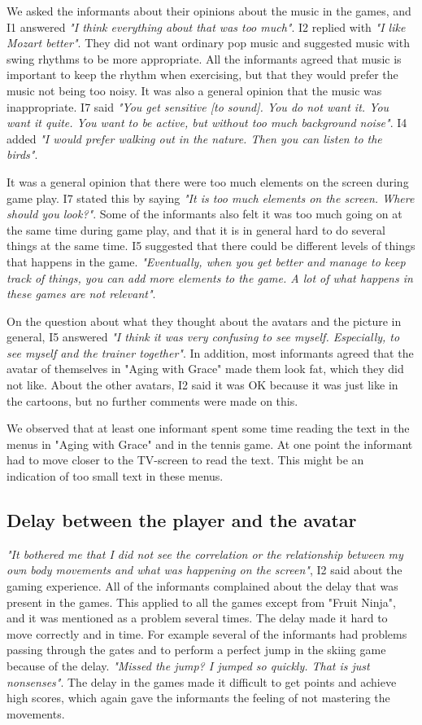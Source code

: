 We asked the informants about their opinions about the music in the games, and I1 answered \emph{"I think everything about that was too much"}. I2 replied with \emph{"I like Mozart better"}. They did not want ordinary pop music and suggested music with swing rhythms to be more appropriate. All the informants agreed that music is important to keep the rhythm when exercising, but that they would prefer the music not being too noisy. It was also a general opinion that the music was inappropriate.  I7 said \emph{"You get sensitive [to sound]. You do not want it. You want it quite. You want to be active, but without too much background noise"}. I4 added \emph{"I would prefer walking out in the nature. Then you can listen to the birds"}.

It was a general opinion that there were too much elements on the screen during game play. I7 stated this by saying \emph{"It is too much elements on the screen. Where should you look?"}. Some of the informants also felt it was too much going on at the same time during game play, and that it is in general hard to do several things at the same time. I5 suggested that there could be different levels of things that happens in the game.  \emph{"Eventually, when you get better and manage to keep track of things, you can add more elements to the game. A lot of what happens in these games are not relevant"}. 

On the question about what they thought about the avatars and the picture in general, I5 answered \emph{"I think it was very confusing to see myself. Especially, to see myself and the trainer together"}. In addition, most informants agreed that the avatar of themselves in "Aging with Grace" made them look fat, which they did not like. About the other avatars, I2 said it was OK because it was just like in the cartoons, but no further comments were made on this.  

We observed that at least one informant spent some time reading the text in the menus in "Aging with Grace" and in the tennis game. At one point the informant had to move closer to the TV-screen to read the text. This might be an indication of too small text in these menus. 

\subsection{Delay between the player and the avatar}

\emph{"It bothered me that I did not see the correlation or the relationship between my own body movements and what was happening on the screen"}, I2 said about the gaming experience. All of the informants complained about the delay that was present in the games. This applied to all the games except from "Fruit Ninja", and it was mentioned as a problem several times. The delay made it hard to move correctly and in time. For example several of the informants had problems passing through the gates and to perform a perfect jump in the skiing game because of the delay. \emph{"Missed the jump? I jumped so quickly. That is just nonsenses"}. The delay in the games made it difficult to get points and achieve high scores, which again gave the informants the feeling of not mastering the movements. 


